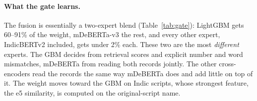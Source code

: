 \paragraph{What the gate learns.} The fusion is essentially a two-expert blend (Table~\ref{tab:gate}):
LightGBM gets 60--91\% of the weight, mDeBERTa-v3 the rest, and every other expert, IndicBERTv2 included,
gets under 2\% each. These two are the most \emph{different} experts. The GBM decides from retrieval scores
and explicit number and word mismatches, mDeBERTa from reading both records jointly. The other
cross-encoders read the records the same way mDeBERTa does and add little on top of it. The weight moves
toward the GBM on Indic scripts, whose strongest feature, the e5 similarity, is computed on the
original-script name.
